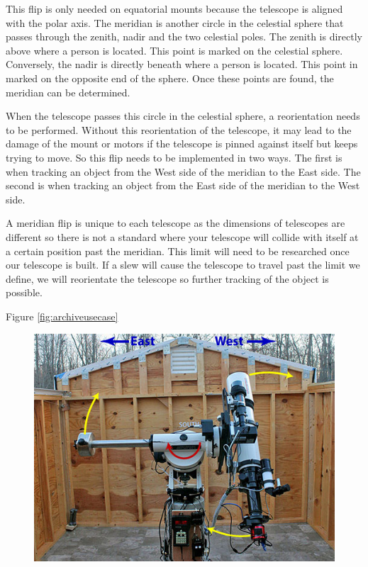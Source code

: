 \documentclass[12pt]{report}
\begin{document}
\begin{enumerate}
This flip is only needed on equatorial mounts because the telescope is aligned with the polar axis. The meridian is another circle in the celestial sphere that passes through the zenith, nadir and the two celestial poles. The zenith is directly above where a person is located. This point is marked on the celestial sphere. Conversely, the nadir is directly beneath where a person is located. This point in marked on the opposite end of the sphere. Once these points are found, the meridian can be determined.

When the telescope passes this circle in the celestial sphere, a reorientation needs to be performed. Without this reorientation of the telescope, it may lead to the damage of the mount or motors if the telescope is pinned against itself but keeps trying to move. So this flip needs to be implemented in two ways. The first is when tracking an object from the West side of the meridian to the East side. The second is when tracking an object from the East side of the meridian to the West side.

A meridian flip is unique to each telescope as the dimensions of telescopes are different so there is not a standard where your telescope will collide with itself at a certain position past the meridian. This limit will need to be researched once our telescope is built. If a slew will cause the telescope to travel past the limit we define, we will reorientate the telescope so further tracking of the object is possible.

Figure \ref{fig:archiveusecase}
\clearpage

\begin{figure}[h]
  \centering
  \includegraphics[width=0.6\linewidth]{beforeflip}
  \label{fig:beforeflip}
\end{figure}


\end{enumerate}
\end{document}
